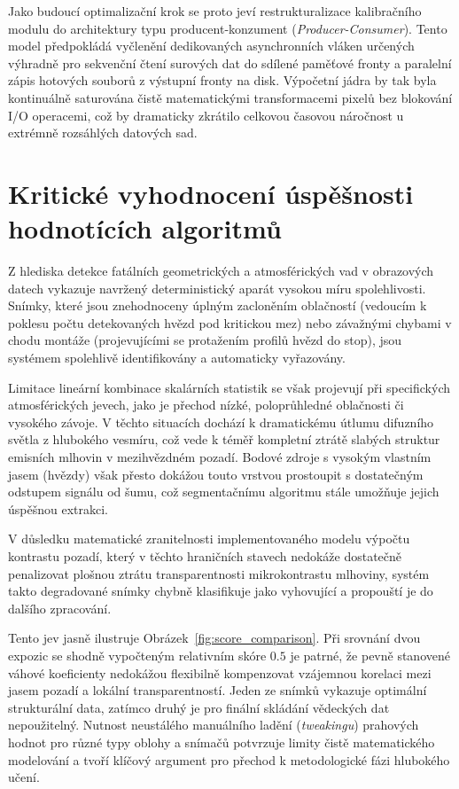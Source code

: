Jako budoucí optimalizační krok se proto jeví restrukturalizace kalibračního modulu do architektury typu producent-konzument (\textit{Producer-Consumer}). Tento model předpokládá vyčlenění dedikovaných asynchronních vláken určených výhradně pro sekvenční čtení surových dat do sdílené paměťové fronty a paralelní zápis hotových souborů z výstupní fronty na disk. Výpočetní jádra by tak byla kontinuálně saturována čistě matematickými transformacemi pixelů bez blokování I/O operacemi, což by dramaticky zkrátilo celkovou časovou náročnost u extrémně rozsáhlých datových sad.

\section{Kritické vyhodnocení úspěšnosti hodnotících algoritmů}
Z hlediska detekce fatálních geometrických a atmosférických vad v obrazových datech vykazuje navržený deterministický aparát vysokou míru spolehlivosti. Snímky, které jsou znehodnoceny úplným zacloněním oblačností (vedoucím k poklesu počtu detekovaných hvězd pod kritickou mez) nebo závažnými chybami v chodu montáže (projevujícími se protažením profilů hvězd do stop), jsou systémem spolehlivě identifikovány a automaticky vyřazovány.

Limitace lineární kombinace skalárních statistik se však projevují při specifických atmosférických jevech, jako je přechod nízké, poloprůhledné oblačnosti či vysokého závoje. V těchto situacích dochází k dramatickému útlumu difuzního světla z hlubokého vesmíru, což vede k téměř kompletní ztrátě slabých struktur emisních mlhovin v mezihvězdném pozadí. Bodové zdroje s vysokým vlastním jasem (hvězdy) však přesto dokážou touto vrstvou prostoupit s dostatečným odstupem signálu od šumu, což segmentačnímu algoritmu stále umožňuje jejich úspěšnou extrakci. 

V důsledku matematické zranitelnosti implementovaného modelu výpočtu kontrastu pozadí, který v těchto hraničních stavech nedokáže dostatečně penalizovat plošnou ztrátu transparentnosti mikrokontrastu mlhoviny, systém takto degradované snímky chybně klasifikuje jako vyhovující a propouští je do dalšího zpracování.

Tento jev jasně ilustruje Obrázek~\ref{fig:score_comparison}. Při srovnání dvou expozic se shodně vypočteným relativním skóre $0.5$ je patrné, že pevně stanovené váhové koeficienty nedokážou flexibilně kompenzovat vzájemnou korelaci mezi jasem pozadí a lokální transparentností. Jeden ze snímků vykazuje optimální strukturální data, zatímco druhý je pro finální skládání vědeckých dat nepoužitelný. Nutnost neustálého manuálního ladění (\textit{tweakingu}) prahových hodnot pro různé typy oblohy a snímačů potvrzuje limity čistě matematického modelování a tvoří klíčový argument pro přechod k metodologické fázi hlubokého učení.

